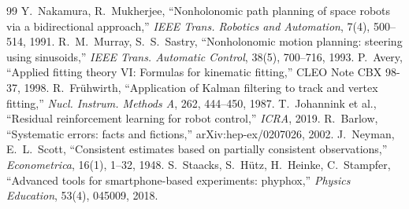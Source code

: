 \documentclass[paper=a4paper,fontsize=10pt,twocolumn,column_gap=2zw,line_length=24zw,number_of_lines=46,head_space=20mm]{jlreq}
\begin{document}
\begin{thebibliography}{99}
 Y.~Nakamura, R.~Mukherjee, ``Nonholonomic path planning of space robots via a bidirectional approach,'' \textit{IEEE Trans. Robotics and Automation}, 7(4), 500--514, 1991.
 R.~M.~Murray, S.~S.~Sastry, ``Nonholonomic motion planning: steering using sinusoids,'' \textit{IEEE Trans. Automatic Control}, 38(5), 700--716, 1993.
 P.~Avery, ``Applied fitting theory VI: Formulas for kinematic fitting,'' CLEO Note CBX 98-37, 1998.
 R.~Frühwirth, ``Application of Kalman filtering to track and vertex fitting,'' \textit{Nucl. Instrum. Methods A}, 262, 444--450, 1987.
 T.~Johannink et al., ``Residual reinforcement learning for robot control,'' \textit{ICRA}, 2019.
 R.~Barlow, ``Systematic errors: facts and fictions,'' arXiv:hep-ex/0207026, 2002.
 J.~Neyman, E.~L.~Scott, ``Consistent estimates based on partially consistent observations,'' \textit{Econometrica}, 16(1), 1--32, 1948.
 S.~Staacks, S.~Hütz, H.~Heinke, C.~Stampfer, ``Advanced tools for smartphone-based experiments: phyphox,'' \textit{Physics Education}, 53(4), 045009, 2018.
\end{thebibliography}
\end{document}
